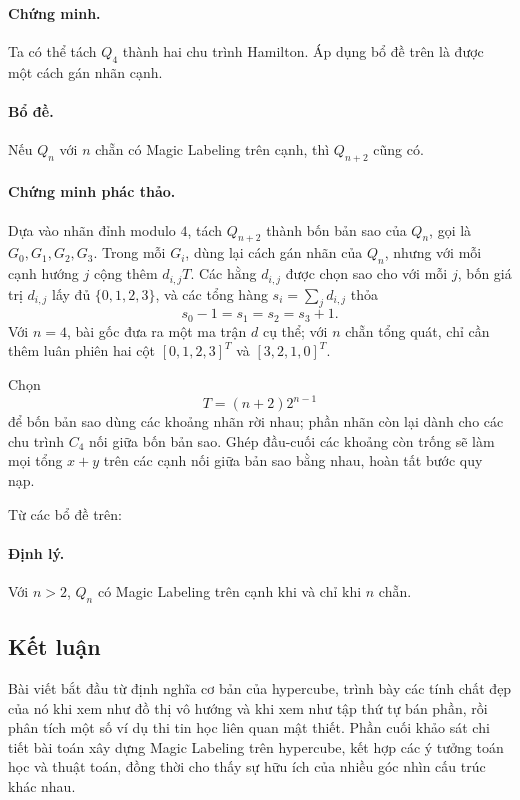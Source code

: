 \documentclass[11pt]{article}
\begin{document}
\paragraph{Chứng minh.}
Ta có thể tách \(Q_4\) thành hai chu trình Hamilton. Áp dụng bổ đề trên là được
một cách gán nhãn cạnh.

\paragraph{Bổ đề.}
Nếu \(Q_n\) với \(n\) chẵn có Magic Labeling trên cạnh, thì \(Q_{n+2}\) cũng
có.

\paragraph{Chứng minh phác thảo.}
Dựa vào nhãn đỉnh modulo \(4\), tách \(Q_{n+2}\) thành bốn bản sao của
\(Q_n\), gọi là \(G_0,G_1,G_2,G_3\). Trong mỗi \(G_i\), dùng lại cách gán nhãn
của \(Q_n\), nhưng với mỗi cạnh hướng \(j\) cộng thêm \(d_{i,j}T\). Các hằng
\(d_{i,j}\) được chọn sao cho với mỗi \(j\), bốn giá trị \(d_{i,j}\) lấy đủ
\(\{0,1,2,3\}\), và các tổng hàng \(s_i=\sum_j d_{i,j}\) thỏa
\[
  s_0-1=s_1=s_2=s_3+1.
\]
Với \(n=4\), bài gốc đưa ra một ma trận \(d\) cụ thể; với \(n\) chẵn tổng quát,
chỉ cần thêm luân phiên hai cột \([0,1,2,3]^T\) và \([3,2,1,0]^T\).

Chọn
\[
  T=(n+2)2^{n-1}
\]
để bốn bản sao dùng các khoảng nhãn rời nhau; phần nhãn còn lại dành cho các
chu trình \(C_4\) nối giữa bốn bản sao. Ghép đầu-cuối các khoảng còn trống sẽ
làm mọi tổng \(x+y\) trên các cạnh nối giữa bản sao bằng nhau, hoàn tất bước
quy nạp.

Từ các bổ đề trên:

\paragraph{Định lý.}
Với \(n>2\), \(Q_n\) có Magic Labeling trên cạnh khi và chỉ khi \(n\) chẵn.

\subsection{Kết luận}

Bài viết bắt đầu từ định nghĩa cơ bản của hypercube, trình bày các tính chất
đẹp của nó khi xem như đồ thị vô hướng và khi xem như tập thứ tự bán phần, rồi
phân tích một số ví dụ thi tin học liên quan mật thiết. Phần cuối khảo sát chi
tiết bài toán xây dựng Magic Labeling trên hypercube, kết hợp các ý tưởng toán
học và thuật toán, đồng thời cho thấy sự hữu ích của nhiều góc nhìn cấu trúc
khác nhau.
\end{document}
